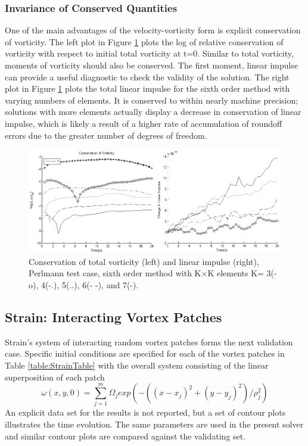 \documentclass[]{aiaa-tc}%
\newcommand{\ben}[1]{\begin{equation}\label{#1}}
\newcommand{\ee}{\end{equation}}
\begin{document}
\subsubsection{Invariance of Conserved Quantities}\label{PConserveW}
One of the main advantages of the velocity-vorticity form is explicit conservation of vorticity. The left plot in Figure \ref{fig:PW_LinImpconserve} plots the log of relative conservation of vorticity with respect to initial total vorticity at t=0. Similar to total vorticity, moments of vorticity should also be conserved. The first moment, linear impulse can provide a useful diagnostic to check the validity of the solution. The right plot in Figure \ref{fig:PW_LinImpconserve} plots the total linear impulse for the sixth order method with varying numbers of elements. It is conserved to within nearly machine precision; solutions with more elements actually display a decrease in conservation of linear impulse, which is likely a result of a higher rate of accumulation of roundoff errors due to the greater number of degrees of freedom.

\begin{figure}
\centering
\includegraphics[width=1\textwidth]{PW_LinImpconserve.png}
\caption{\label{fig:PW_LinImpconserve}Conservation of total vorticity (left) and linear impulse (right), Perlmann test case, sixth order method with K$\times$K elements K= 3(-o), 4(-.), 5(..), 6(- -), and 7(-).}
\end{figure}

\subsection{Strain: Interacting Vortex Patches}
Strain's system of interacting random vortex patches \cite{Strain1996} forms the next validation case. Specific initial conditions are specified for each of the vortex patches in Table \ref{table:StrainTable} with the overall system consisting of the linear superposition of each patch
\ben{StrainV} \omega(x,y,0) = \sum_{j=1}^m \Omega_j exp(-((x-x_j)^2 + (y-y_j)^2)/\rho_j^2) \ee
An explicit data set for the results is not reported, but a set of contour plots illustrates the time evolution. The same parameters are used in the present solver and similar contour plots are compared against the validating set.
\end{document}
